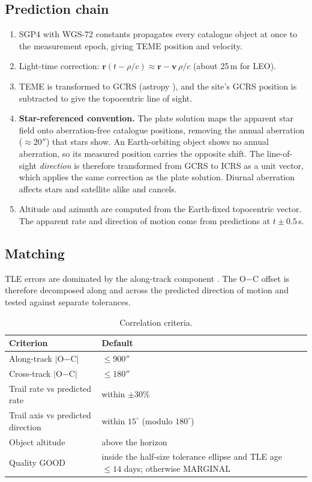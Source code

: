 \documentclass[11pt,a4paper]{article}
\newcommand{\brkus}{\textunderscore\allowbreak}
\newcommand{\code}[1]{{\ttfamily\let\_\brkus #1}}
\begin{document}
\subsection{Prediction chain}
\begin{enumerate}
\item SGP4 \cite{vallado2006} with WGS-72 constants propagates every catalogue object at once to
      the measurement epoch, giving TEME position and velocity.
\item Light-time correction: $\mathbf{r}(t-\rho/c) \approx \mathbf{r} - \mathbf{v}\,\rho/c$
      (about 25\,m for LEO).
\item TEME is transformed to GCRS (astropy \cite{astropy2022}), and the site's GCRS position is subtracted to give
      the topocentric line of sight.
\item \textbf{Star-referenced convention.} The plate solution maps the apparent star field onto
      aberration-free catalogue positions, removing the annual aberration ($\approx20''$) that
      stars show. An Earth-orbiting object shows no annual aberration, so its measured position
      carries the opposite shift. The line-of-sight \emph{direction} is therefore transformed from
      GCRS to ICRS as a unit vector, which applies the same correction as the plate solution.
      Diurnal aberration affects stars and satellite alike and cancels.
\item Altitude and azimuth are computed from the Earth-fixed topocentric vector. The apparent
      rate and direction of motion come from predictions at $t\pm0.5$\,s.
\end{enumerate}

\subsection{Matching}
TLE errors are dominated by the along-track component \cite{flohrer2008}. The O$-$C offset is
therefore decomposed along and across the predicted direction of motion and tested against
separate tolerances.

\begin{table}[H]
\centering\small
\begin{tabularx}{\textwidth}{@{}p{55mm}L@{}}
\toprule
\textbf{Criterion} & \textbf{Default} \\
\midrule
Along-track $|$O$-$C$|$ & $\leq 900''$ \\
Cross-track $|$O$-$C$|$ & $\leq 180''$ \\
Trail rate vs predicted rate & within $\pm30\%$ \\
Trail axis vs predicted direction & within $15^\circ$ (modulo $180^\circ$) \\
Object altitude & above the horizon \\
Quality \code{GOOD} & inside the half-size tolerance ellipse and TLE age $\leq14$ days; otherwise \code{MARGINAL} \\
\bottomrule
\end{tabularx}
\caption{Correlation criteria.}
\end{table}
\end{document}
